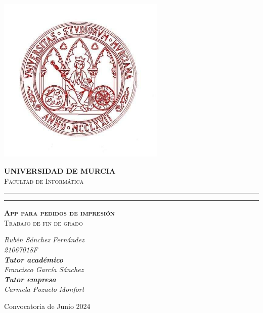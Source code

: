 \documentclass[11pt]{article}
\begin{document}
\begin{titlepage}
    \begin{center}

        {\phantom{a}\par}

        \includegraphics[width=0.6\textwidth]{imagenes/logo.jpg}

        \scshape\Large\textbf{UNIVERSIDAD DE MURCIA}
        \\\scshape\Large Facultad de Informática

        \rule{\linewidth}{0.1pt}
        \rule{\linewidth}{0.1pt}

        \vspace{1cm}
        \scshape\huge\textbf{App para pedidos de impresión}\\
        \scshape\Large Trabajo de fin de grado


        \vspace{1cm}

        \itshape\large
        Rubén Sánchez Fernández\\
        21067018F\\

        \vspace{0.5cm}
        \textbf{Tutor académico}\\
        \itshape\large
        Francisco García Sánchez\\
        \textbf{Tutor empresa}\\
        \itshape\large
        Carmela Pozuelo Monfort\\
        \vspace{0.5cm}


        \vfill
        {\large Convocatoria de Junio 2024}
    \end{center}
\end{titlepage}
\end{document}
